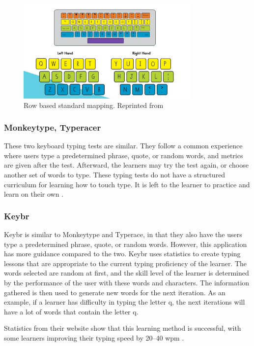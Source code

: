 \documentclass{report}
\begin{document}
\begin{figure}[H]
	\centering
	\includegraphics[width=0.8\textwidth]{kwt.png}
	\caption{Row based standard mapping. Reprinted from }
	\label{fig:kwt}
	\centering
\end{figure}


\subsubsection{Monkeytype, Typeracer}

These two keyboard typing tests are similar. They follow a common experience
where users type a predetermined phrase, quote, or random words, and metrics are
given after the test. Afterward, the learners may try the test again, or choose
another set of words to type. These typing tests do not have a structured
curriculum for learning how to touch type. It is left to the learner to practice
and learn on their own \parencite{bartnik2021, typeracer}.

\subsubsection{Keybr}

Keybr is similar to Monkeytype and Typerace, in that they also have the users
type a predetermined phrase, quote, or random words. However, this application
has more guidance compared to the two. Keybr uses statistics to create typing
lessons that are appropriate to the current typing proficiency of the learner.
The words selected are random at first, and the skill level of the learner is
determined by the performance of the user with these words and characters. The
information gathered is then used to generate new words for the next iteration.
As an example, if a learner has difficulty in typing the letter q, the next
iterations will have a lot of words that contain the letter q.

Statistics from their website show that this learning method is successful, with
some learners improving their typing speed by 20--40 \ac{wpm} \parencite{keybr}.
\end{document}
